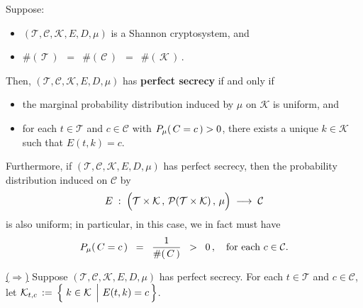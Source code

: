 \clearpage
\begin{theorem}[Shannon]
\mbox{}
\vskip 0.1cm
\noindent
Suppose:
\begin{itemize}
\item
	$(\mathcal{T},\mathcal{C},\mathcal{K},E,D,\mu)$
	is a Shannon cryptosystem, and
\item
	$\#\!\left(\,\mathcal{T}\,\right)$
	\,$=$\,
	$\#\!\left(\,\mathcal{C}\,\right)$
	\,$=$\,
	$\#\!\left(\,\mathcal{K}\,\right)$\,.
\end{itemize}
Then, $(\mathcal{T},\mathcal{C},\mathcal{K},E,D,\mu)$
has \textbf{perfect secrecy} if and only if
\begin{itemize}
\item
	the marginal probability distribution induced by $\mu$ on $\mathcal{K}$ is uniform, and
\item
	for each $t \in \mathcal{T}$ and $c \in \mathcal{C}$
	with $P_{\mu}\!\left(\,C \overset{{\color{white}.}}{=} c\,\right) > 0$,
	there exists a unique $k \in \mathcal{K}$
	such that $E(t,k) = c$.
\end{itemize}
Furthermore, if $(\mathcal{T},\mathcal{C},\mathcal{K},E,D,\mu)$
has perfect secrecy, then the probability distribution induced on $\mathcal{C}$ by
\begin{equation*}
E
\; : \;
	\left(
		\mathcal{T}\overset{{\color{white}.}}{\times}\mathcal{K}
		\,,\,\mathcal{P}(\mathcal{T}\times\mathcal{K})
		\,,\,\mu
	\right)
\;\longrightarrow\;
	\mathcal{C}
\end{equation*}
is also uniform; in particular, in this case, we in fact must have
\begin{equation*}
P_{\mu}\!\left(\,C \overset{{\color{white}.}}{=} c\,\right)
\;\; = \;\;
	\dfrac{1}{\#\!\left(\,C\,\right)}
\;\; > \;\;
	0\,,
\quad
\textnormal{for each $c \in \mathcal{C}$}.
\end{equation*}
\end{theorem}

\proof
\vskip 0.2cm
\noindent
\underline{($\Longrightarrow$)}
\vskip 0.2cm
\noindent
Suppose $(\mathcal{T},\mathcal{C},\mathcal{K},E,D,\mu)$ has perfect secrecy.
For each $t \in \mathcal{T}$ and $c \in \mathcal{C}$, let
$\mathcal{K}_{t,c} \,:=\, \left\{\,\left. k \overset{{\color{white}.}}{\in} \mathcal{K} \;\,\right\vert\, E(t,k) = c\,\right\}$.

